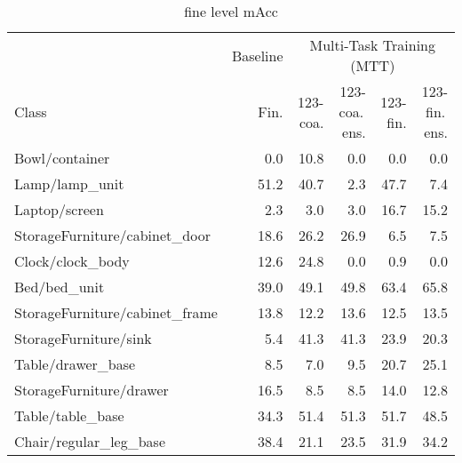 
\begin{table}[!h]
\caption{fine level mAcc}
\centering
\begin{tabular}{lrrrrr}
\toprule
 &  \multicolumn{1}{c}{Baseline} & \multicolumn{4}{c}{Multi-Task Training (MTT)} \\
 \cmidrule{3-6}
Class 			  &  	 Fin. &  	123-coa. &  		123-coa.\,ens. &  	  123-fin. &  123-fin.\,ens. \\
\midrule
Bowl/container                 &            0.0 &            10.8 &                     0.0 &           0.0 &                   0.0 \\
Lamp/lamp\_unit                 &           51.2 &            40.7 &                     2.3 &          47.7 &                   7.4 \\
Laptop/screen                  &            2.3 &             3.0 &                     3.0 &          16.7 &                  15.2 \\
StorageFurniture/cabinet\_door  &           18.6 &            26.2 &                    26.9 &           6.5 &                   7.5 \\
Clock/clock\_body               &           12.6 &            24.8 &                     0.0 &           0.9 &                   0.0 \\
Bed/bed\_unit                   &           39.0 &            49.1 &                    49.8 &          63.4 &                  65.8 \\
StorageFurniture/cabinet\_frame &           13.8 &            12.2 &                    13.6 &          12.5 &                  13.5 \\
StorageFurniture/sink          &            5.4 &            41.3 &                    41.3 &          23.9 &                  20.3 \\
Table/drawer\_base              &            8.5 &             7.0 &                     9.5 &          20.7 &                  25.1 \\
StorageFurniture/drawer        &           16.5 &             8.5 &                     8.5 &          14.0 &                  12.8 \\
Table/table\_base               &           34.3 &            51.4 &                    51.3 &          51.7 &                  48.5 \\
Chair/regular\_leg\_base         &           38.4 &            21.1 &                    23.5 &          31.9 &                  34.2 \\

\end{tabular}
\end{table}
